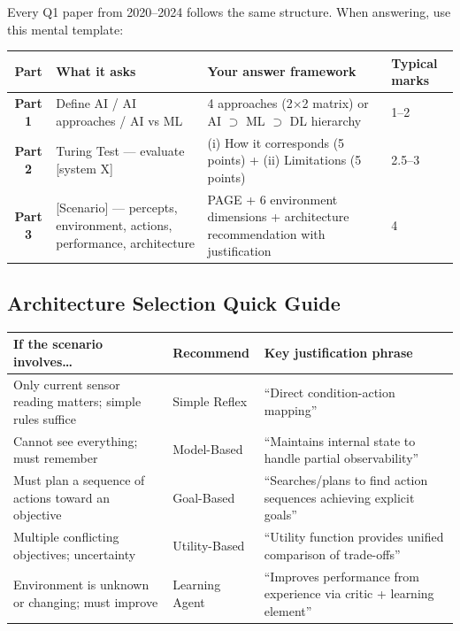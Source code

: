 \documentclass[12pt, a4paper]{article}
\begin{document}
\noindent Every Q1 paper from 2020–2024 follows the same structure. When answering, use this mental template:

\begin{center}
\renewcommand{\arraystretch}{1.4}
\begin{tabular}{c|p{5.5cm}|p{5.5cm}|p{5.5cm}}
\toprule
\textbf{Part} & \textbf{What it asks} & \textbf{Your answer framework} & \textbf{Typical marks} \\
\midrule
\textbf{Part 1} & Define AI / AI approaches / AI vs ML & 4 approaches (2$\times$2 matrix) or AI $\supset$ ML $\supset$ DL hierarchy & 1--2 \\
\midrule
\textbf{Part 2} & Turing Test — evaluate [system X] & (i) How it corresponds (5 points) + (ii) Limitations (5 points) & 2.5--3 \\
\midrule
\textbf{Part 3} & [Scenario] — percepts, environment, actions, performance, architecture & PAGE + 6 environment dimensions + architecture recommendation with justification & 4 \\
\bottomrule
\end{tabular}
\end{center}

\subsection*{Architecture Selection Quick Guide}

\begin{center}
\renewcommand{\arraystretch}{1.4}
\begin{tabular}{l|l|l}
\toprule
\textbf{If the scenario involves\ldots} & \textbf{Recommend} & \textbf{Key justification phrase} \\
\midrule
Only current sensor reading matters; simple rules suffice & Simple Reflex & ``Direct condition-action mapping'' \\
Cannot see everything; must remember & Model-Based & ``Maintains internal state to handle partial observability'' \\
Must plan a sequence of actions toward an objective & Goal-Based & ``Searches/plans to find action sequences achieving explicit goals'' \\
Multiple conflicting objectives; uncertainty & Utility-Based & ``Utility function provides unified comparison of trade-offs'' \\
Environment is unknown or changing; must improve & Learning Agent & ``Improves performance from experience via critic + learning element'' \\
\midrule
\end{tabular}
\end{center}
\end{document}
